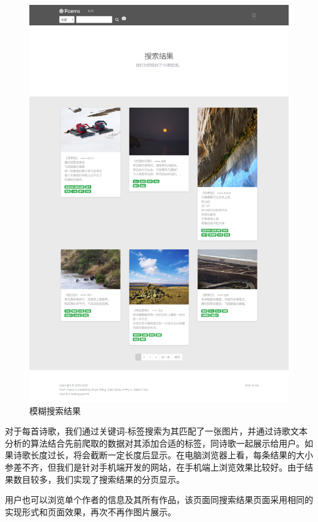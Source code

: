 \documentclass[a4paper, 10pt]{article}
\begin{document}
\begin{figure}[H]
\centering
\includegraphics[scale=0.475]{fig/demo_vagueres.png}
\caption{模糊搜索结果}
\label{fig:demo_vagueres}
\end{figure}

对于每首诗歌，我们通过关键词-标签搜索为其匹配了一张图片，并通过诗歌文本分析的算法结合先前爬取的数据对其添加合适的标签，同诗歌一起展示给用户。如果诗歌长度过长，将会截断一定长度后显示。在电脑浏览器上看，每条结果的大小参差不齐，但我们是针对手机端开发的网站，在手机端上浏览效果比较好。由于结果数目较多，我们实现了搜索结果的分页显示。

用户也可以浏览单个作者的信息及其所有作品，该页面同搜索结果页面采用相同的实现形式和页面效果，再次不再作图片展示。
\end{document}
